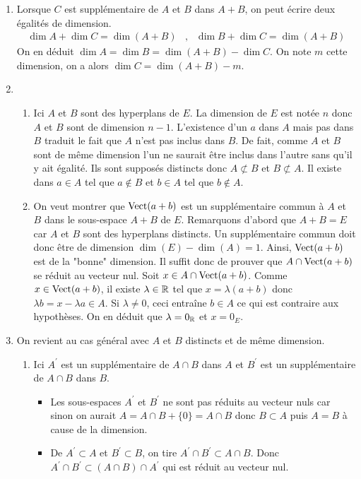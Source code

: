\begin{enumerate}
 \item Lorsque $C$ est supplémentaire de $A$ et $B$ dans $A+B$, on peut écrire deux égalités de dimension.
\begin{align*}
 \dim A + \dim C = \dim (A+B) &,& \dim B + \dim C = \dim (A+B)
\end{align*}
On en déduit $\dim A =\dim B = \dim (A+B) - \dim C$. On note $m$ cette dimension, on a alors $\dim C =\dim (A+B) -m$. 
\item 
\begin{enumerate}
 \item Ici $A$ et $B$ sont des hyperplans de $E$. La dimension de $E$ est notée $n$ donc $A$ et $B$ sont de dimension $n-1$. L'existence d'un $a$ dans $A$ mais pas dans $B$ traduit le fait que $A$ n'est pas inclus dans $B$. De fait, comme $A$ et $B$ sont de même dimension l'un ne saurait être inclus dans l'autre sans qu'il y ait égalité. Ils sont supposés distincts donc $A\not \subset B$ et $B\not \subset A$. Il existe dans $a\in A$ tel que $a\not \in B$ et $b\in A$ tel que $b \not \in A$.

 \item On veut montrer que $\operatorname{Vect} (a+b)$ est un supplémentaire commun à $A$ et $B$ dans le sous-espace $A+B$ de $E$. Remarquons d'abord que $A+B=E$ car $A$ et $B$ sont des hyperplans distincts. Un supplémentaire commun doit donc être de dimension $\dim(E)-\dim(A)=1$. Ainsi, $\operatorname{Vect} (a+b)$ est de la "bonne"  dimension. Il suffit donc de prouver que $A\cap \operatorname{Vect} (a+b)$ se réduit au vecteur nul. \newline
Soit $x\in A\cap \operatorname{Vect} (a+b)$. Comme $x\in \operatorname{Vect} (a+b)$, il existe $\lambda \in \mathbb{R}$ tel que $x=\lambda (a+b)$ donc $\lambda b= x -\lambda a\in A$. Si $\lambda \neq 0$, ceci entraîne $b\in A$ ce qui est contraire aux hypothèses. On en déduit que $\lambda=0_{\mathbb{R}}$ et $x=0_E$.
\end{enumerate}

\item On revient au cas général avec $A$ et $B$ distincts et de même dimension.
\begin{enumerate}
 \item Ici $A^\prime$ est un supplémentaire de $A\cap B$ dans $A$ et $B^\prime$ est un supplémentaire de $A\cap B$ dans $B$.
\begin{itemize}
 \item Les sous-espaces $A^\prime$ et $B^\prime$ ne sont pas réduits au vecteur nuls car sinon on aurait $A= A\cap B +\{0\}= A\cap B$ donc $B\subset A$ puis $A=B$ à cause de la dimension.
\item De $A^\prime \subset A$ et $B^\prime \subset B$, on tire $A^\prime \cap B^\prime \subset A\cap B$. Donc $A^\prime \cap B^\prime \subset (A\cap B)\cap A^\prime$ qui est réduit au vecteur nul.


\end{itemize}
\end{enumerate}
\end{enumerate}
